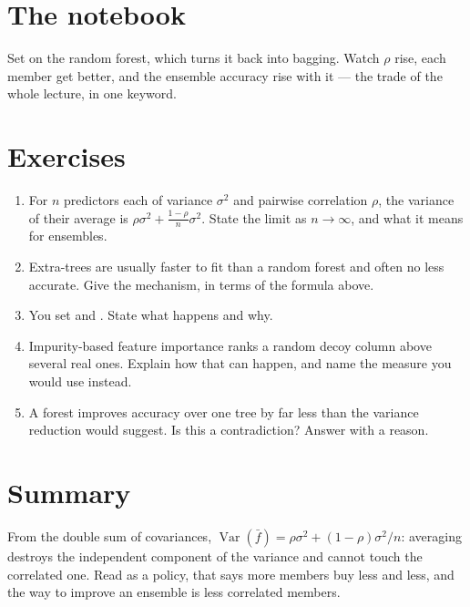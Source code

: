 \documentclass[11pt,a4paper]{article}
\begin{document}
\section{The notebook}

\begin{trybox}[title={What to change}]
Set  on the random forest, which turns it back into
bagging. Watch $\rho$ rise, each member get better, and the ensemble accuracy
rise with it --- the trade of the whole lecture, in one keyword.
\end{trybox}

\section{Exercises}

\begin{enumerate}[leftmargin=1.6em,itemsep=4pt]
  \item For $n$ predictors each of variance $\sigma^2$ and pairwise correlation
        $\rho$, the variance of their average is
        $\rho\sigma^2 + \frac{1-\rho}{n}\sigma^2$. State the limit as
        $n \to \infty$, and what it means for ensembles. \hfill \scope{[5]}
  \item Extra-trees are usually faster to fit than a random forest and often no
        less accurate. Give the mechanism, in terms of the formula above.
        \hfill \scope{[4]}
  \item You set  and . State what
        happens and why. \hfill \scope{[3]}
  \item Impurity-based feature importance ranks a random decoy column above
        several real ones. Explain how that can happen, and name the measure
        you would use instead. \hfill \scope{[5]}
  \item A forest improves accuracy over one tree by far less than the variance
        reduction would suggest. Is this a contradiction? Answer with a reason.
        \hfill \scope{[4]}
\end{enumerate}

\section*{Summary}

From the double sum of covariances,
$\operatorname{Var}(\bar f) = \rho\sigma^2 + (1-\rho)\sigma^2/n$: averaging
destroys the independent component of the variance and cannot touch the
correlated one. Read as a policy, that says more members buy less and less, and
the way to improve an ensemble is less correlated members.
\end{document}
